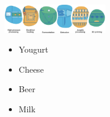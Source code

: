 \begin{minipage}
{0.60\linewidth}
    \includegraphics[width=45mm]{src/Images/foodprocessing_tech.png}
\end{minipage}
\begin{minipage}
{0.48\linewidth}
\begin{itemize}
    \item Yougurt
    \item Cheese
    \item Beer
    \item Milk
\end{itemize}
\end{minipage}